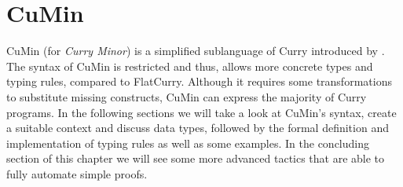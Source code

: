 \documentclass[paper = a4, fleqn, abstract=on, twoside]{scrreprt}
\begin{document}
\chapter{CuMin}
\label{cumin}
CuMin (for \textit{Curry Minor}) is a simplified sublanguage of Curry introduced by \citet{p19mehner}. The syntax of CuMin is restricted and thus, allows more concrete types and typing rules, compared to FlatCurry. Although it requires some transformations to substitute missing constructs, CuMin can express the majority of Curry programs. In the following sections we will take a look at CuMin's syntax, create a suitable context and discuss data types, followed by the formal definition and implementation of typing rules as well as some examples. In the concluding section of this chapter we will see some more advanced tactics that are able to fully automate simple proofs.
\end{document}
